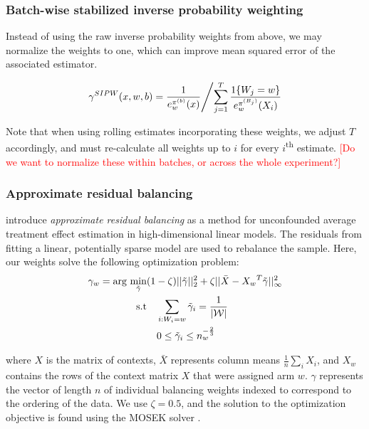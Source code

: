 \documentclass[letterpaper, 12pt, parskip=full, headsepline]{scrartcl}
\begin{document}
\subsubsection{Batch-wise stabilized inverse probability weighting} \label{appendix:stabilized}
Instead of using the raw inverse probability weights from above, we may normalize the weights to one, which can improve mean squared error of the associated estimator. 

\begin{align}
\left.
\gamma^{SIPW}(x, w, b) = \frac{ 1 }{e_{w}^{\pi^{(b)}}(x)}   
\middle/ 
{ \sum_{j = 1}^T \frac{1\{W_{j} = w\}}{e_{w}^{\pi^{(B_j)}}(X_i)} }
\right.
\end{align}

Note that when using rolling estimates incorporating these weights, we adjust $T$ accordingly, and must re-calculate all weights up to $i$ for every $i$\textsuperscript{th} estimate. \textcolor{red}{[Do we want to normalize these within batches, or across the whole experiment?]}

\subsubsection{Approximate residual balancing} \label{appendix:arb}

\cite{athey2018approximate} introduce \textit{approximate residual balancing} as a method for unconfounded average
treatment effect estimation in high-dimensional linear models. The residuals from fitting a linear, potentially sparse model are used to rebalance the sample. Here, our weights solve the following optimization problem:
\begin{align}
\begin{split}
\gamma_w = \arg\min_{\tilde{\gamma}}& (1 - \zeta) ||\tilde{\gamma}||_2^2 +\zeta ||\bar{X} - \boldmath{X_w}^T\tilde{\gamma}||_{\infty}^2\\
\text{s.t}& \quad \sum\limits_{i:W_i=w} \tilde{\gamma}_i = \frac{1}{|\mathcal{W}|} \\
&\quad 0\leq \tilde{\gamma}_i \leq n_w^{-\frac{2}{3}}
\label{eq:arb_problem}
\end{split}
\end{align}

where $X$ is the matrix of contexts, $\bar{X}$ represents column means $\frac{1}{n}\sum_{i} X_{i}$, and $X_w$ contains the rows of the context matrix $X$ that were assigned arm $w$. $\gamma$ represents the vector of length $n$ of individual balancing weights indexed to correspond to the ordering of the data. We use $\zeta = 0.5$, and the solution to the optimization objective is found using the MOSEK solver \citep{mosek2019}. %
\end{document}
